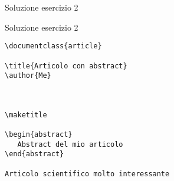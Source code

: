 \begin{frame}[fragile]{Soluzione esercizio 2}

\begin{block}{Soluzione esercizio 2}
\begin{lstlisting}
\documentclass{article}

\title{Articolo con abstract}
\author{Me}



\maketitle 

\begin{abstract}
   Abstract del mio articolo
\end{abstract}

Articolo scientifico molto interessante


\end{lstlisting}
\end{block}

\end{frame}